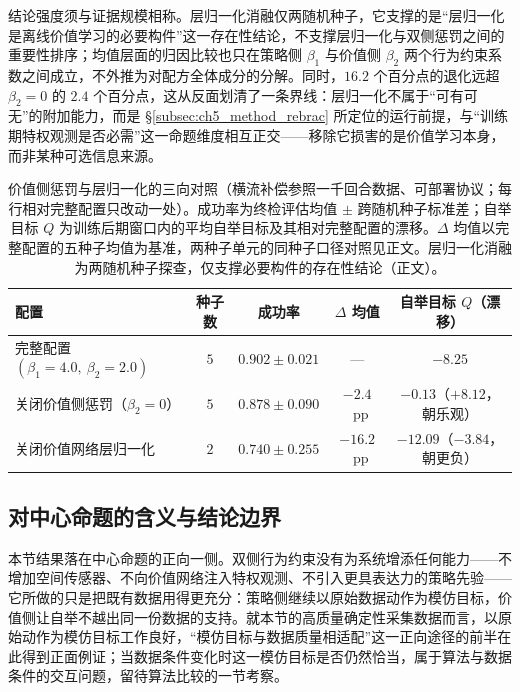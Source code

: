 结论强度须与证据规模相称。层归一化消融仅两随机种子，它支撑的是“层归一化是离线价值学习的必要构件”这一存在性结论，不支撑层归一化与双侧惩罚之间的重要性排序；均值层面的归因比较也只在策略侧 $\beta_1$ 与价值侧 $\beta_2$ 两个行为约束系数之间成立，不外推为对配方全体成分的分解。同时，$16.2$ 个百分点的退化远超 $\beta_2 = 0$ 的 $2.4$ 个百分点，这从反面划清了一条界线：层归一化不属于“可有可无”的附加能力，而是 \S\ref{subsec:ch5_method_rebrac} 所定位的运行前提，与“训练期特权观测是否必需”这一命题维度相互正交——移除它损害的是价值学习本身，而非某种可选信息来源。

\begin{table}[t]
\centering
\caption{价值侧惩罚与层归一化的三向对照（横流补偿参照一千回合数据、可部署协议；每行相对完整配置只改动一处）。成功率为终检评估均值 $\pm$ 跨随机种子标准差；自举目标 $Q$ 为训练后期窗口内的平均自举目标及其相对完整配置的漂移。$\Delta$ 均值以完整配置的五种子均值为基准，两种子单元的同种子口径对照见正文。层归一化消融为两随机种子探查，仅支撑必要构件的存在性结论（正文）。}
\label{tab:ch5_rebrac_ablation}
\setlength{\tabcolsep}{5pt}
\begin{tabular}{l c c c c}
\toprule
\textbf{配置} & \textbf{种子数} & \textbf{成功率} & \textbf{$\Delta$ 均值} & \textbf{自举目标 $Q$（漂移）} \\
\midrule
完整配置 $(\beta_1{=}4.0,\ \beta_2{=}2.0)$ & $5$ & $0.902 \pm 0.021$ & --- & $-8.25$ \\
关闭价值侧惩罚（$\beta_2 = 0$） & $5$ & $0.878 \pm 0.090$ & $-2.4$~pp & $-0.13$（$+8.12$，朝乐观） \\
关闭价值网络层归一化 & $2$ & $0.740 \pm 0.255$ & $-16.2$~pp & $-12.09$（$-3.84$，朝更负） \\
\bottomrule
\end{tabular}
\end{table}

\subsection{对中心命题的含义与结论边界}\label{subsec:ch5_rebrac_implications}

本节结果落在中心命题的正向一侧。双侧行为约束没有为系统增添任何能力——不增加空间传感器、不向价值网络注入特权观测、不引入更具表达力的策略先验——它所做的只是把既有数据用得更充分：策略侧继续以原始数据动作为模仿目标，价值侧让自举不越出同一份数据的支持。就本节的高质量确定性采集数据而言，以原始动作为模仿目标工作良好，“模仿目标与数据质量相适配”这一正向途径的前半在此得到正面例证；当数据条件变化时这一模仿目标是否仍然恰当，属于算法与数据条件的交互问题，留待算法比较的一节考察。


